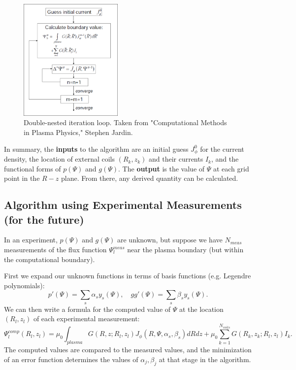 \documentclass[paper=letter, fontsize=11pt]{scrartcl} %
\begin{document}
\begin{figure}
\centering
\captionsetup{justification=centering,margin=3cm}
\caption[caption]{Double-nested iteration loop. Taken from "Computational Methods in Plasma Physics," Stephen Jardin.}
\includegraphics[width=0.45\textwidth]{algorithm}
\end{figure}

In summary, the \textbf{inputs} to the algorithm are an initial guess $J_\phi^0$ for the current density, the location of external coils $(R_k,z_k)$ and their currents $I_k$, and the functional forms of $p(\Psi)$ and $g(\Psi)$.  The \textbf{output} is the value of $\Psi$ at each grid point in the $R-z$ plane.  From there, any derived quantity can be calculated.  

\subsection{Algorithm using Experimental Measurements (for the future)}

In an experiment, $p(\Psi)$ and $g(\Psi)$ are unknown, but suppose we have $N_{meas}$ measurements of the flux function $\Psi_l^{meas}$ near the plasma boundary (but within the computational boundary).  

First we expand our unknown functions in terms of basis functions (e.g. Legendre polynomials):
\begin{equation}
p'(\Psi) = \sum_s \alpha_s y_s(\Psi), \quad gg'(\Psi) = \sum_s \beta_s y_s(\Psi).
\end{equation}
We can then write a formula for the computed value of $\Psi$ at the location $(R_l, z_l)$ of each experimental measurement: 
\begin{equation}
\Psi_l^{comp}(R_l, z_l) = \mu_0 \int_{plasma} G(R,z; R_l,z_l) J_\phi(R,\Psi,\alpha_s,\beta_s) dR dz + \mu_0 \sum_{k=1}^{N_{coils}} G(R_k ,z_k; R_l,z_l) I_k.
\end{equation}
The computed values are compared to the measured values, and the minimization of an error function determines the values of $\alpha_j, \beta_j$ at that stage in the algorithm.   
\end{document}
